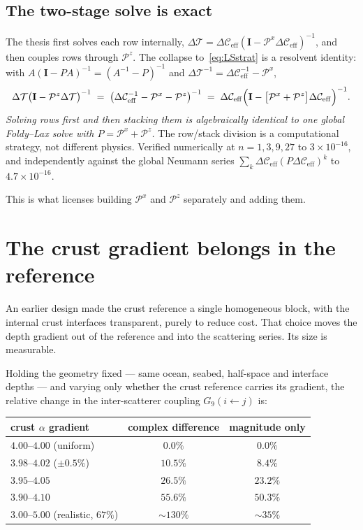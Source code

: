 \documentclass[11pt,a4paper]{article}
\newcommand{\bI}{\mathbf{I}}
\newcommand{\Pz}{\mathcal{P}^{z}}
\newcommand{\Px}{\mathcal{P}^{x}}
\newcommand{\dC}{\Delta\mathcal{C}_{\mathrm{eff}}}
\newcommand{\dT}{\Delta\mathcal{T}}
\begin{document}
\subsection{The two-stage solve is exact}

The thesis first solves each row internally,
$\dT = \dC(\bI - \Px\dC)^{-1}$, and then couples rows through $\Pz$.  The
collapse to~\eqref{eq:LSstrat} is a resolvent identity: with
$A(\bI-PA)^{-1} = (A^{-1}-P)^{-1}$ and $\dT^{-1} = \dC^{-1} - \Px$,
\begin{equation}\label{eq:collapse}
  \dT\bigl(\bI - \Pz\dT\bigr)^{-1}
  \;=\;\bigl(\dC^{-1} - \Px - \Pz\bigr)^{-1}
  \;=\;\dC\Bigl(\bI - \bigl[\Px+\Pz\bigr]\dC\Bigr)^{-1}.
\end{equation}
\emph{Solving rows first and then stacking them is algebraically identical to
one global Foldy--Lax solve with $P = \Px + \Pz$.}  The row/stack division is a
computational strategy, not different physics.  Verified numerically at
$n = 1,3,9,27$ to $3\times10^{-16}$, and independently against the global
Neumann series $\sum_{k}\dC(P\dC)^{k}$ to $4.7\times10^{-16}$.

This is what licenses building $\Px$ and $\Pz$ separately and adding them.

\section{The crust gradient belongs in the reference}

An earlier design made the crust reference a single homogeneous block, with the
internal crust interfaces transparent, purely to reduce cost.  That choice
moves the depth gradient out of the reference and into the scattering series.
Its size is measurable.

Holding the geometry fixed --- same ocean, seabed, half-space and interface
depths --- and varying only whether the crust reference carries its gradient,
the relative change in the inter-scatterer coupling $G_{9}(i\!\leftarrow\!j)$ is:

\begin{center}
\begin{tabular}{lcc}
\toprule
crust $\alpha$ gradient & complex difference & magnitude only \\
\midrule
$4.00$--$4.00$ (uniform)          & $0.0\%$  & $0.0\%$ \\
$3.98$--$4.02$ ($\pm0.5\%$)       & $\mathbf{10.5\%}$ & $8.4\%$ \\
$3.95$--$4.05$                    & $26.5\%$ & $23.2\%$ \\
$3.90$--$4.10$                    & $55.6\%$ & $50.3\%$ \\
$3.00$--$5.00$ (realistic, $67\%$)& ${\sim}130\%$ & ${\sim}35\%$ \\
\bottomrule
\end{tabular}
\end{center}
\end{document}
